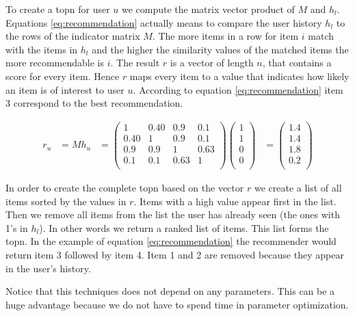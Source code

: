 To create a \gls{topn} for user $u$ we compute the matrix vector product of $M$ and $h_l$. Equations \ref{eq:recommendation} actually means to compare the user history $h_l$ to the rows of the indicator matrix $M$. The more items in a row for item $i$ match with the items in $h_l$ and the higher the similarity values of the matched items the more recommendable is $i$. The result $r$ is a vector of length $n$, that contains a score for every item. Hence $r$ maps every item to a value that indicates how likely an item is of interest to user $u$. According to equation \ref{eq:recommendation} item 3 correspond to the best recommendation.

\begin{align}
  \label{eq:recommendation}
r_u &= M h_u 
&=
\begin{pmatrix}
  1  & 0.40 & 0.9 & 0.1 \\
 0.40 &1  & 0.9 & 0.1 \\
  0.9 & 0.9 &1  & 0.63 \\
  0.1 & 0.1 & 0.63 &1 \\  
\end{pmatrix} 
\begin{pmatrix}
 1 \\
 1 \\
 0 \\
 0 \\
\end{pmatrix}
&= 
\begin{pmatrix}
 1.4 \\
 1.4 \\
 1.8 \\
 0.2 \\
\end{pmatrix}
\end{align}

In order to create the complete \gls{topn} based on the vector $r$ we create a list of all items sorted by the values in $r$. Items with a high value appear first in the list. Then we remove all items from the list the user has already seen (the ones with 1's in $h_l$). In other words we return a ranked list of items. This list forms the \gls{topn}. In the example of equation \ref{eq:recommendation} the recommender would return item 3 followed by item 4. Item 1 and 2 are removed because they appear in the user's history.

Notice that this techniques does not depend on any parameters. This can be a huge advantage because we do not have to spend time in parameter optimization.